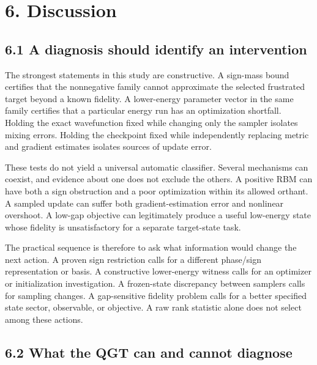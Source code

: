 \documentclass[
  11pt,
  a4paper,
]{article}
\begin{document}
\hypertarget{discussion}{%
\section{6. Discussion}\label{discussion}}

\hypertarget{a-diagnosis-should-identify-an-intervention}{%
\subsection{6.1 A diagnosis should identify an
intervention}\label{a-diagnosis-should-identify-an-intervention}}

The strongest statements in this study are constructive. A sign-mass
bound certifies that the nonnegative family cannot approximate the
selected frustrated target beyond a known fidelity. A lower-energy
parameter vector in the same family certifies that a particular energy
run has an optimization shortfall. Holding the exact wavefunction fixed
while changing only the sampler isolates mixing errors. Holding the
checkpoint fixed while independently replacing metric and gradient
estimates isolates sources of update error.

These tests do not yield a universal automatic classifier. Several
mechanisms can coexist, and evidence about one does not exclude the
others. A positive RBM can have both a sign obstruction and a poor
optimization within its allowed orthant. A sampled update can suffer
both gradient-estimation error and nonlinear overshoot. A low-gap
objective can legitimately produce a useful low-energy state whose
fidelity is unsatisfactory for a separate target-state task.

The practical sequence is therefore to ask what information would change
the next action. A proven sign restriction calls for a different
phase/sign representation or basis. A constructive lower-energy witness
calls for an optimizer or initialization investigation. A frozen-state
discrepancy between samplers calls for sampling changes. A gap-sensitive
fidelity problem calls for a better specified state sector, observable,
or objective. A raw rank statistic alone does not select among these
actions.

\hypertarget{what-the-qgt-can-and-cannot-diagnose}{%
\subsection{6.2 What the QGT can and cannot
diagnose}\label{what-the-qgt-can-and-cannot-diagnose}}
\end{document}
